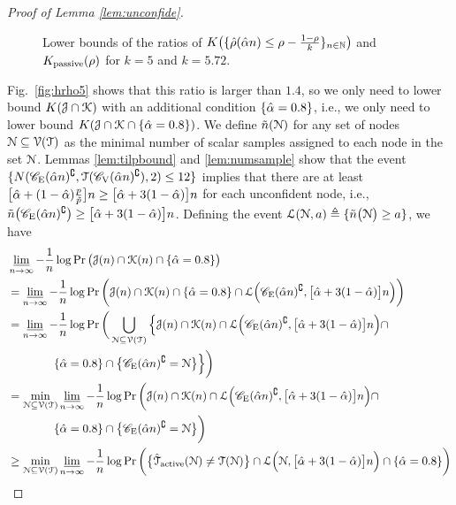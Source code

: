 \begin{proof}[Proof of Lemma \ref{lem:unconfide}]
\begin{figure}[t]
{		}%
		\centering
		\caption{Lower bounds of the ratios of $K\big(\{\hat{\rho}(\hat{\alpha} n)\leq \rho-\frac{1-\rho}{k}\}_{n\in\mathbb{N}}\big)$ and $K_{{\rm passive}}(\rho)$ for $k=5$ and $k=5.72$.}
	\end{figure}
	Fig.~\ref{fig:hrho5} shows that this ratio is larger than $1.4$, so we only need to lower bound $K(\mathcal{J}\cap \mathcal{K})$ with an additional condition $\{\hat{\alpha} =0.8\}$, i.e., we only need to lower bound $K(\mathcal{J}\cap \mathcal{K}\cap\{ \hat{\alpha}=0.8\})$. We define $\tilde{n} (\mathcal{N})$ for any set of nodes $\mathcal{N}\subseteq \mathcal{V}(\mathcal{T})$ as the minimal number of scalar samples assigned to 
	each node in the set $\mathcal{N}$. Lemmas \ref{lem:tilpbound} and \ref{lem:numsample} show that the event $\{N(\mathscr{C}_{\mathrm{E}}(\hat{\alpha} n)^{\complement},\mathcal{T}(\mathscr{C}_{\mathrm{V}}(\hat{\alpha} n)^{\complement}),2)\leq 12\}$ implies that there are at least $\big[\hat{\alpha}+(1-\hat{\alpha})\frac{p}{\tilde{p}}\big]n\geq \big[\hat{\alpha}+3(1-\hat{\alpha})\big]n$ for each 
	unconfident node, i.e., $\tilde{n} \big(\mathscr{C}_{\mathrm{E}}(\hat{\alpha} n)^{\complement}\big)\geq \big[\hat{\alpha}+3(1-\hat{\alpha})\big]n$. Defining the event $\mathcal{L}(\mathcal{N},a) \triangleq \{\tilde{n} \big(\mathcal{N} \big)\geq a\}$, we have
	\begin{align}
		&\varliminf_{n\rightarrow\infty}-\frac{1}{n}\log\Pr\big(\calJ(n)\cap \calK(n)\cap\{ \halpha=0.8\}\big)\nonumber\\*
		&=\varliminf_{n\rightarrow\infty}-\frac{1}{n}\log\Pr\bigg(\calJ(n)\cap \calK(n)\cap\{ \halpha=0.8\}\cap \calL\Big(\scC_{\mathrm{E}}(\halpha n)^{\complement},\big[\halpha+3(1-\halpha)\big]n\Big)\bigg)\label{unconf:eq1}\\
		&=\varliminf_{n\rightarrow\infty}-\frac{1}{n}\log\Pr\bigg(\bigcup_{\calN\subseteq \calV(\calT)} \Big\{\calJ(n)\cap \calK(n)\cap \calL\Big(\scC_{\mathrm{E}}(\halpha n)^{\complement},\big[\halpha+3(1-\halpha)\big]n\Big) \cap\nonumber\\*
		&\qquad\qquad \{ \halpha=0.8\} \cap\big\{\scC_{\mathrm{E}}(\halpha n)^{\complement}=\calN\big\}\Big\}\bigg)\\
		&=\min_{\calN\subseteq \calV(\calT)}\varliminf_{n\rightarrow\infty}-\frac{1}{n}\log\Pr\bigg(\calJ(n)\cap \calK(n)\cap \calL\Big(\scC_{\mathrm{E}}(\halpha n)^{\complement},\big[\halpha+3(1-\halpha)\big]n\Big) \cap\nonumber\\*
		&\qquad\qquad\{ \halpha=0.8\} \cap\big\{\scC_{\mathrm{E}}(\halpha n)^{\complement}=\calN\big\}\bigg)\label{unconf:ieq1}\\
		&\geq \min_{\calN\subseteq \calV(\calT)}\varliminf_{n\rightarrow\infty}-\frac{1}{n}\log\Pr\bigg(\big\{\hatcalT_{\Active}(\calN)\neq\calT(\calN)\big\}\cap \calL\Big(\calN,\big[\halpha+3(1-\halpha)\big]n\Big) \cap \{ \halpha=0.8\}\bigg)\\

\end{align}
\end{proof}
